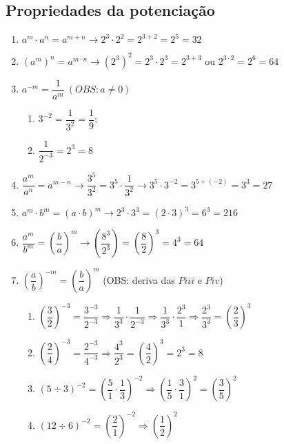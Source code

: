 \subsection{Propriedades da potenciação}
\begin{enumerate}[label=P\roman*)]
	\item $ a^{m} \cdot a^{n} = a^{m+n} \longrightarrow 2^{3} \cdot 2^{2} = 2^{3+2} = 2^{5} = 32 $
	\item $ (a^{m})^{n} = a^{m\cdot n} \longrightarrow (2^{3})^{2} = 2^{3}\cdot 2^{3} = 2^{3+3} $ ou $ 2^{3\cdot 2} = 2^{6} = 64 $
	\item $ a^{-m} = \dfrac{1}{a^{m}}\ (OBS: a \neq 0)$
	\begin{enumerate}[label=\alph*)]
		\item $ 3^{-2} = \dfrac{1}{3^{2}} = \dfrac{1}{9}; $
		
		\item $\dfrac{1}{2^{-3}} = 2^{3} = 8 $ 
	\end{enumerate}
	\item $ \dfrac{a^{m}}{a^{n}} = a^{m-n} \longrightarrow \dfrac{3^{5}}{3^{2}} = 3^{5}\cdot \dfrac{1}{3^{2}} \longrightarrow 3^{5}\cdot 3^{-2} = 3^{5+(-2)} = 3^{3} = 27$
	\item $ a^{m}\cdot b^{m}= (a\cdot b)^{m} \longrightarrow 2^{3}\cdot 3^{3} = (2\cdot 3)^{3} = 6^{3} = 216 $
	\item $ \dfrac{a^{m}}{b^{m}} = (\dfrac{b}{a})^{m} \longrightarrow (\dfrac{8^{3}}{2^{3}}) = (\dfrac{8}{2})^{3} = 4^{3} = 64 $
	\item $ (\dfrac{a}{b})^{-m} = (\dfrac{b}{a})^{m} $ (OBS: deriva das $ Piii $ e $ Piv $)
	\begin{enumerate}[label=\alph*)]
		\item $ (\dfrac{3}{2})^{-3} = \dfrac{3^{-3}}{2^{-3}} \Longrightarrow \dfrac{1}{3^{3}}\cdot \dfrac{1}{2^{-3}} \Longrightarrow \dfrac{1}{3^{3}}\cdot \dfrac{2^{3}}{1} \Longrightarrow \dfrac{2^{3}}{3^{3}} = (\dfrac{2}{3})^{3} $
		
		\item $ (\dfrac{2}{4})^{-3} = \dfrac{2^{-3}}{4^{-3}} \Longrightarrow \dfrac{4^{3}}{2^{3}} = (\dfrac{4}{2})^{3}  = 2^{3} = 8 $
		
		\item $ (5 \div 3)^{-2} = (\dfrac{5}{1} \cdot \dfrac{1}{3})^{-2} \Longrightarrow (\dfrac{1}{5} \cdot \dfrac{3}{1})^{2} = (\dfrac{3}{5})^{2} $
		
		\item $ (12 \div 6)^{-2} = (\dfrac{2}{1})^{-2} \Longrightarrow (\dfrac{1}{2})^{2} $
	\end{enumerate}
\end{enumerate}

